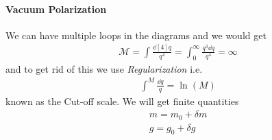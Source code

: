 \documentclass[../main.tex]{subfiles}
\begin{document}
\paragraph*{Vacuum Polarization} We can have multiple loops in the diagrams and we would get
\begin{align*}
    \mathcal{M} = \int \frac{\dd[4]{q}}{q^4} = \int_0^\infty \frac{q^3 \dd{q}}{q^4} = \infty
\end{align*}
and to get rid of this we use \emph{Regularization} i.e.
\begin{align*}
    \int^M \frac{\dd{q}}{q} = \ln(M)
\end{align*}
known as the Cut-off scale. We will get finite quantities
\begin{align*}
    m = m_0 + \delta m \\
    g = g_0 + \delta g
\end{align*}
\end{document}
